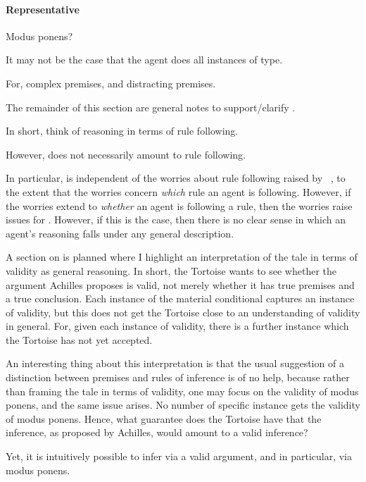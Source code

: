 \paragraph{Representative}

\begin{note}
  Modus ponens?

  It may not be the case that the agent does all instances of type.

  For, complex premises, and distracting premises.
\end{note}

{
  \color{red}

  The remainder of this section are general notes to support/clarify \tR{}.

  In short, think of reasoning in terms of rule following.

  However, \tR{} does not necessarily amount to rule following.

  In particular, \tR{} is independent of the worries about rule following raised by ~\textcite{Kripke:1982aa}, to the extent that the worries concern \emph{which} rule an agent is following.
  However, if the worries extend to \emph{whether} an agent is following a rule, then the worries raise issues for \tR{}.
  However, if this is the case, then there is no clear sense in which an agent's reasoning falls under any general description.

  A section on \textcite{Carroll:1895uj} is planned where I highlight an interpretation of the tale in terms of validity as general reasoning.
  In short, the Tortoise wants to see whether the argument Achilles proposes is valid, not merely whether it has true premises and a true conclusion.
  Each instance of the material conditional captures an instance of validity, but this does not get the Tortoise close to an understanding of validity in general.
  For, given each instance of validity, there is a further instance which the Tortoise has not yet accepted.

  An interesting thing about this interpretation is that the usual suggestion of a distinction between premises and rules of inference is of no help, because rather than framing the tale in terms of validity, one may focus on the validity of modus ponens, and the same issue arises.
  No number of specific instance gets the validity of modus ponens.
  Hence, what guarantee does the Tortoise have that the inference, as proposed by Achilles, would amount to a valid inference?

  Yet, it is intuitively possible to infer via a valid argument, and in particular, via modus ponens.
}

